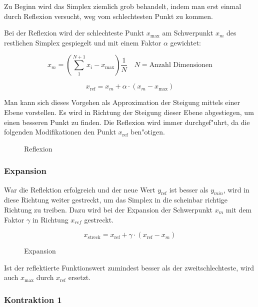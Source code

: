 Zu Beginn wird das Simplex ziemlich grob behandelt, indem man erst einmal
durch Reflexion versucht, weg vom schlechtesten Punkt zu kommen.

Bei der Reflexion wird der schlechteste Punkt $x_{\text{max}}$ am
Schwerpunkt $x_m$ des restlichen Simplex gespiegelt und mit einem Faktor
$\alpha$ gewichtet:

\begin{equation}
x_m = \left(\sum_1^{N+1} x_i - x_{\text{max}}\right) \frac{1}{N} \quad N = \text{Anzahl Dimensionen}
\end{equation}

\begin{equation}
x_{\text{ref}} = x_m + \alpha \cdot (x_m-x_{\text{max}})
\end{equation}

Man kann sich dieses Vorgehen als Approximation der Steigung mittels
einer Ebene vorstellen. Es wird in Richtung der Steigung dieser Ebene
abgestiegen, um einen besseren Punkt zu finden. Die Reflexion wird
immer durchgef"uhrt, da die folgenden Modifikationen den Punkt $x_{\text{ref}}$
ben"otigen.

\begin{figure}[h]
	\centering
  	\caption{Reflexion}%
	\label{fig:Reflexion}%
\end{figure}

\subsubsection{Expansion}
War die Reflektion erfolgreich und der neue Wert $y_{\text{ref}}$ ist besser als $y_{min}$, wird in diese Richtung weiter gestreckt, um das Simplex in die scheinbar richtige Richtung zu treiben.
Dazu wird bei der Expansion der Schwerpunkt $x_m$ mit dem Faktor $\gamma$ in Richtung $x_{ref}$ gestreckt.

\begin{equation}
x_{\text{streck}} = x_{\text{ref}} + \gamma \cdot (x_{\text{ref}}-x_{m})
\end{equation}
\begin{figure}[h]
	\centering
  	\caption{Expansion}%
	\label{fig:Streckung}%
\end{figure}

Ist der reflektierte Funktionswert zumindest besser als der zweitschlechteste, wird auch $x_{\text{max}}$ durch $x_{\text{ref}}$ ersetzt.


\subsubsection{Kontraktion 1}

